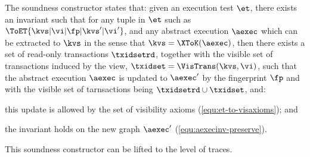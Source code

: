 The soundness constructor states that:
given an execution test \( \et \), there exists an invariant such that
for any tuple in \( \et \) such as \( \ToET{\kvs | \vi | \fp | \kvs' | \vi' } \),
and any abstract execution \( \aexec \) which can be extracted to \( \kvs \) 
in the sense that \( \kvs = \XToK(\aexec) \),
then there exists a set of read-only transactions \( \txidsetrd \),
together with the visible set of transactions 
induced by the view, \( \txidset = \VisTrans(\kvs,\vi) \), such that
the abstract execution \( \aexec \) is updated to \( \aexec' \)
by the fingerprint \( \fp \) and with the visible set of tarnsactions being \( \txidsetrd \cup \txidset \),
and:
\begin{enumerate*}
\item this update is allowed by the set of visibility axioms (\cref{equ:et-to-visaxioms}); and 
\item the invariant holds on the new graph \( \aexec' \) (\cref{equ:aexecinv-preserve}).
\end{enumerate*}
This soundness constructor can be lifted to the level of traces.

